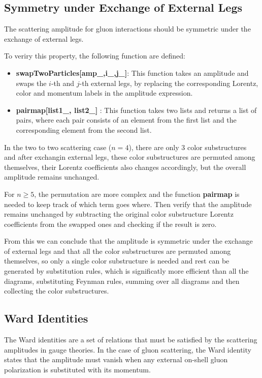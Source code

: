 \documentclass[main.tex]{subfiles}
\begin{document}
\subsection{Symmetry under Exchange of External Legs}
The scattering amplitude for gluon interactions should be symmetric under the exchange of external legs.

To veriry this property, the following function are defined:

\begin{itemize}
    \item \textbf{swapTwoParticles[amp_,i_,j_]}: This function takes an amplitude and swaps the $i$-th and $j$-th external legs, 
    by replacing the corresponding Lorentz, color and momentum labels in the amplitude expression.
    \item \textbf{pairmap[list1_, list2_]} : This function takes two lists and returns a list of pairs, where each pair consists of an element from the first list and the corresponding element from the second list.
\end{itemize}

In the two to two scattering case ($n=4$), there are only 3 color substructures and after exchangin external legs, these color substructures
are permuted among themselves, their Lorentz coefficients also changes accordingly, but the overall amplitude remains unchanged.

For $n \ge 5$, the permutation are more complex and the function \textbf{pairmap} is needed to keep track of which term goes where. Then verify that the amplitude remains unchanged 
by subtracting the original color substructure Lorentz coefficients from the swapped ones and checking if the result is zero.

From this we can conclude that the amplitude is symmetric under the exchange of external legs and that
all the color substructures are permuted among themselves, so only a single color substructure is needed and rest can be generated
by substitution rules, which is significatly more efficient than all the diagrams, substituting Feynman rules, summing over all diagrams 
and then collecting the color substructures. 

\subsection{Ward Identities}
The Ward identities are a set of relations that must be satisfied by the scattering amplitudes in gauge theories.
In the case of gluon scattering, the Ward identity states that the amplitude must vanish when any external on-shell gluon polarization is substituted
with its momentum.
\end{document}
